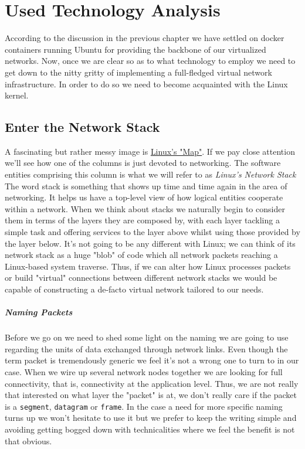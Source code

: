 \chapter{Used Technology Analysis}
    According to the discussion in the previous chapter we have settled on docker containers running Ubuntu for providing the backbone of our virtualized networks. Now, once we are clear so as to what technology to employ we need to get down to the nitty gritty of implementing a full-fledged virtual network infrastructure. In order to do so we need to become acquainted with the Linux kernel.

    \section{Enter the Network Stack}
        A fascinating but rather messy image is \href{https://upload.wikimedia.org/wikipedia/commons/5/5b/Linux_kernel_map.png}{Linux's "Map"}. If we pay close attention we'll see how one of the columns is just devoted to networking. The software entities comprising this column is what we will refer to as \textit{Linux's Network Stack}\\

         The word stack is something that shows up time and time again in the area of networking. It helps us have a top-level view of how logical entities cooperate within a network. When we think about stacks we naturally begin to consider them in terms of the layers they are composed by, with each layer tackling a simple task and offering services to the layer above whilst using those provided by the layer below. It's not going to be any different with Linux; we can think of its network stack as a huge "blob" of code which all network packets reaching a Linux-based system traverse. Thus, if we can alter how Linux processes packets or build "virtual" connections between different network stacks we would be capable of constructing a de-facto virtual network tailored to our needs.\\

         \paragraph{Naming Packets}
            Before we go on we need to shed some light on the naming we are going to use regarding the units of data exchanged through network links. Even though the term packet is tremendously generic we feel it's not a wrong one to turn to in our case. When we wire up several network nodes together we are looking for full connectivity, that is, connectivity at the application level. Thus, we are not really that interested on what layer the "packet" is at, we don't really care if the packet is a \texttt{segment}, \texttt{datagram} or \texttt{frame}. In the case a need for more specific naming turns up we won't hesitate to use it but we prefer to keep the writing simple and avoiding getting bogged down with technicalities where we feel the benefit is not that obvious.

